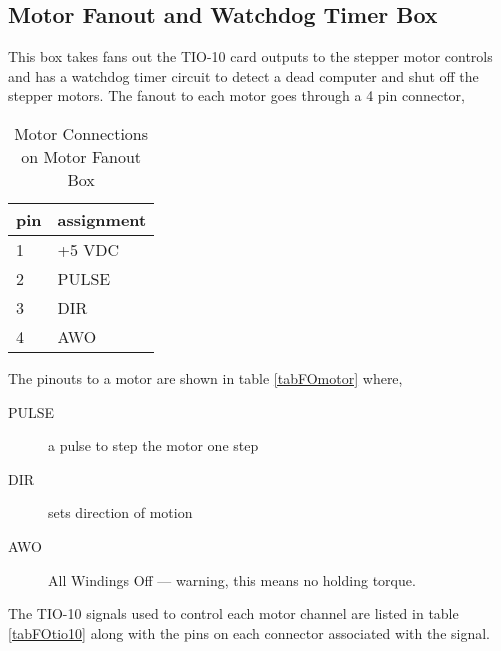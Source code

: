\subsection{Motor Fanout and Watchdog Timer Box}
This box takes fans out the TIO-10 card outputs to the stepper motor
controls and has a watchdog timer circuit to detect a dead computer
and shut off the stepper motors.
The fanout to each motor goes through a 4 pin connector,
\begin{table}[htb]
\begin{center}
\begin{tabular}{|l|l|}
\hline
pin & assignment \\
\hline
1 & +5 VDC\\
2 & PULSE \\
3 & DIR \\
4 & AWO \\
\hline
\end{tabular}
\caption[Motor connections on Motor Fanout Box]
        {Motor Connections on Motor Fanout Box
        }
\end{center}
\end{table}
The pinouts to a motor are shown in table \ref{tabFOmotor} where,
\begin{description}
\item[PULSE] a pulse to step the motor one step
\item[DIR] sets direction of motion
\item[AWO] All Windings Off --- warning, this means no holding torque.
\end{description}  
The TIO-10 signals used to control each motor channel are listed in
table \ref{tabFOtio10} along with the pins on each connector associated
with the signal.

